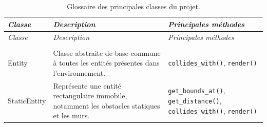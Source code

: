 \begin{longtable}{
        >{\ttfamily\small}p{}
        p{}
        >{\ttfamily\small}p{}
    }
    \caption{Glossaire des principales classes du projet.}
    \label{tab:class_glossary}                                                                                                                                                                                                                                                                                                                                                                             \\

    \toprule
    \textnormal{\textit{Classe}} &
    \textit{Description}         & \textnormal{\textit{Principales méthodes}}                                                                                                                                                                                                                                                                                                                              \\
    \midrule
    \endfirsthead

    \toprule
    \textnormal{\textit{Classe}} &
    \textit{Description}         & \textnormal{\textit{Principales méthodes}}                                                                                                                                                                                                                                                                                                                              \\
    \midrule
    \endhead

    \midrule
    \\
    \endfoot

    \bottomrule
    \endlastfoot

    Entity                       & Classe abstraite de base commune à toutes les entités présentes dans l'environnement.                                                                                          & \texttt{collides\_with()}, \texttt{render()}                                                                                                                                           \\


    StaticEntity                 & Représente une entité rectangulaire immobile, notamment les obstacles statiques et les murs.                                                                                   & \texttt{get\_bounds\_at()}, \texttt{get\_distance()}, \texttt{collides\_with()}, \texttt{render()}                                                                                     \\



\end{longtable}
